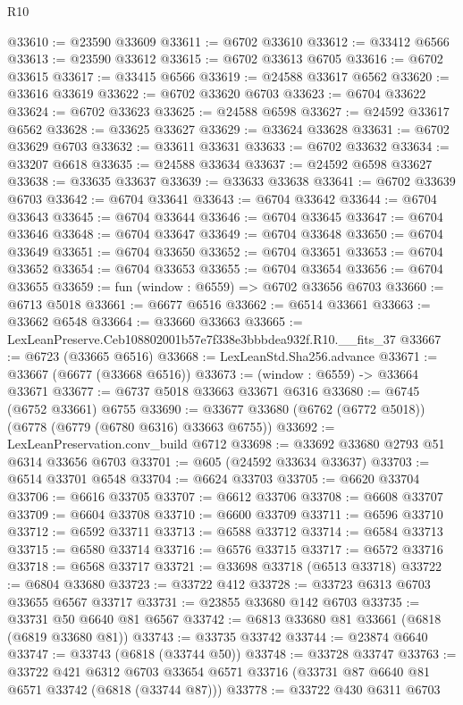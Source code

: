 \begin{lexlean}{R10}
\begin{coremodule}
@33610 := @23590 @33609
@33611 := @6702 @33610
@33612 := @33412 @6566
@33613 := @23590 @33612
@33615 := @6702 @33613 @6705
@33616 := @6702 @33615
@33617 := @33415 @6566
@33619 := @24588 @33617 @6562
@33620 := @33616 @33619
@33622 := @6702 @33620 @6703
@33623 := @6704 @33622
@33624 := @6702 @33623
@33625 := @24588 @6598
@33627 := @24592 @33617 @6562
@33628 := @33625 @33627
@33629 := @33624 @33628
@33631 := @6702 @33629 @6703
@33632 := @33611 @33631
@33633 := @6702 @33632
@33634 := @33207 @6618
@33635 := @24588 @33634
@33637 := @24592 @6598 @33627
@33638 := @33635 @33637
@33639 := @33633 @33638
@33641 := @6702 @33639 @6703
@33642 := @6704 @33641
@33643 := @6704 @33642
@33644 := @6704 @33643
@33645 := @6704 @33644
@33646 := @6704 @33645
@33647 := @6704 @33646
@33648 := @6704 @33647
@33649 := @6704 @33648
@33650 := @6704 @33649
@33651 := @6704 @33650
@33652 := @6704 @33651
@33653 := @6704 @33652
@33654 := @6704 @33653
@33655 := @6704 @33654
@33656 := @6704 @33655
@33659 := fun (window : @6559) => @6702 @33656 @6703
@33660 := @6713 @5018
@33661 := @6677 @6516
@33662 := @6514 @33661
@33663 := @33662 @6548
@33664 := @33660 @33663
@33665 := LexLeanPreserve.Ceb108802001b57e7f338e3bbbdea932f.R10.__fits_37
@33667 := @6723 (@33665 @6516)
@33668 := LexLeanStd.Sha256.advance
@33671 := @33667 (@6677 (@33668 @6516))
@33673 := (window : @6559) -> @33664 @33671
@33677 := @6737 @5018 @33663 @33671 @6316
@33680 := @6745 (@6752 @33661) @6755
@33690 := @33677 @33680 (@6762 (@6772 @5018)) (@6778 (@6779 (@6780 @6316) @33663 @6755))
@33692 := LexLeanPreservation.conv_build @6712
@33698 := @33692 @33680 @2793 @51 @6314 @33656 @6703
@33701 := @605 (@24592 @33634 @33637)
@33703 := @6514 @33701 @6548
@33704 := @6624 @33703
@33705 := @6620 @33704
@33706 := @6616 @33705
@33707 := @6612 @33706
@33708 := @6608 @33707
@33709 := @6604 @33708
@33710 := @6600 @33709
@33711 := @6596 @33710
@33712 := @6592 @33711
@33713 := @6588 @33712
@33714 := @6584 @33713
@33715 := @6580 @33714
@33716 := @6576 @33715
@33717 := @6572 @33716
@33718 := @6568 @33717
@33721 := @33698 @33718 (@6513 @33718)
@33722 := @6804 @33680
@33723 := @33722 @412
@33728 := @33723 @6313 @6703 @33655 @6567 @33717
@33731 := @23855 @33680 @142 @6703
@33735 := @33731 @50 @6640 @81 @6567
@33742 := @6813 @33680 @81 @33661 (@6818 (@6819 @33680 @81))
@33743 := @33735 @33742
@33744 := @23874 @6640
@33747 := @33743 (@6818 (@33744 @50))
@33748 := @33728 @33747
@33763 := @33722
    @421
    @6312
    @6703
    @33654
    @6571
    @33716
    (@33731 @87 @6640 @81 @6571 @33742 (@6818 (@33744 @87)))
@33778 := @33722
    @430
    @6311
    @6703

\end{coremodule}
\end{lexlean}
